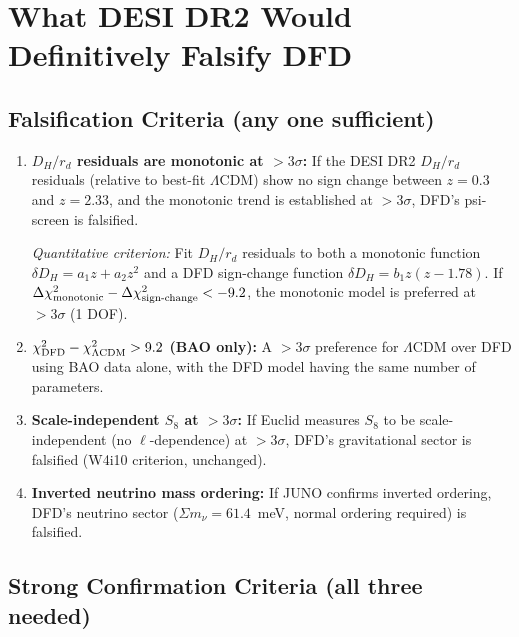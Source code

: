 \documentclass[11pt,a4paper]{article}
\newcommand{\LCDM}{$\Lambda$CDM}
\begin{document}
\section{What DESI DR2 Would Definitively Falsify DFD}
\label{sec:falsification}

\begin{tcolorbox}[colback=blue!3!white, colframe=blue!60!black,
  title=\textbf{Finding \thesection: Falsification and Confirmation
  Criteria}\label{find:falsification}]

\subsection*{Falsification Criteria (any one sufficient)}

\begin{enumerate}
\item \textbf{$D_H/r_d$ residuals are monotonic at $>3\sigma$:}
  If the DESI DR2 $D_H/r_d$ residuals (relative to best-fit \LCDM{})
  show no sign change between $z = 0.3$ and $z = 2.33$, and the
  monotonic trend is established at $>3\sigma$, DFD's psi-screen
  is falsified.

  \textit{Quantitative criterion:} Fit $D_H/r_d$ residuals to
  both a monotonic function $\delta D_H = a_1 z + a_2 z^2$ and a
  DFD sign-change function $\delta D_H = b_1 z(z - 1.78)$. If
  $\Delta\chi^2_{\rm monotonic} - \Delta\chi^2_{\rm sign\text{-}change}
  < -9.2$, the monotonic model is preferred at $>3\sigma$ (1 DOF).

\item \textbf{$\chi^2_{\rm DFD} - \chi^2_{\Lambda\rm CDM} > 9.2$
  (BAO only):} A $>3\sigma$ preference for \LCDM{} over DFD using
  BAO data alone, with the DFD model having the same number of
  parameters.

\item \textbf{Scale-independent $S_8$ at $>3\sigma$:} If Euclid
  measures $S_8$ to be scale-independent (no $\ell$-dependence) at
  $>3\sigma$, DFD's gravitational sector is falsified (W4i10
  criterion, unchanged).

\item \textbf{Inverted neutrino mass ordering:} If JUNO confirms
  inverted ordering, DFD's neutrino sector ($\Sigma m_\nu = 61.4$~meV,
  normal ordering required) is falsified.
\end{enumerate}

\subsection*{Strong Confirmation Criteria (all three needed)}


\end{tcolorbox}
\end{document}
